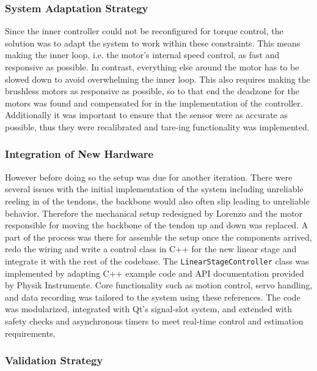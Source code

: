 \subsubsection{System Adaptation Strategy}
Since the inner controller could not be reconfigured for torque control, the solution was to adapt the system to work within these constraints. This means making the inner loop, i.e. the motor's internal speed control, as fast and responsive as possible. In contrast, everything else around the motor has to be slowed down to avoid overwhelming the inner loop.
\newline \newline
This also requires making the brushless motors as responsive as possible, so to that end the deadzone for the motors was found and compensated for in the implementation of the controller. Additionally it was important to ensure that the sensor were as accurate as possible, thus they were recalibrated and tare-ing functionality was implemented.

\subsubsection{Integration of New Hardware}
However before doing so the setup was due for another iteration. There were several issues with the initial implementation of the system including unreliable reeling in of the tendons, the backbone would also often slip leading to unreliable behavior. Therefore the mechanical setup redesigned by Lorenzo and the motor responsible for moving the backbone of the tendon up and down was replaced. A part of the process was there for assemble the setup once the components arrived, redo the wiring and write a control class in C++ for the new linear stage and integrate it with the rest of the codebase.
\newline \newline
The \texttt{LinearStageController} class was implemented by adapting C++ example code and API documentation provided by Physik Instrumente. Core functionality such as motion control, servo handling, and data recording was tailored to the system using these references. The code was modularized, integrated with Qt’s signal-slot system, and extended with safety checks and asynchronous timers to meet real-time control and estimation requirements.



\subsubsection{Validation Strategy}



